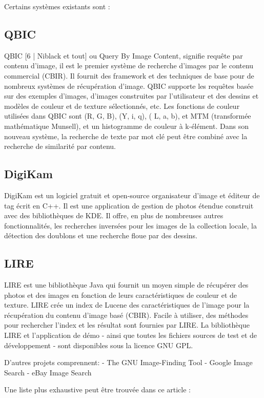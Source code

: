 Certains systèmes existants sont : 

\subsection*{QBIC}
	QBIC [6 | Niblack et tout] ou Query By Image Content, signifie requête par contenu d'image, il est le premier système de recherche d'images par le contenu commercial (CBIR). Il fournit des framework et des techniques de base pour de nombreux systèmes de récupération d'image. QBIC supporte les requêtes basée sur des exemples d'images, d'images construites par l'utilisateur et des dessins et modèles de couleur et de texture sélectionnés, etc. Les fonctions de couleur utilisées dans QBIC sont (R, G, B), (Y, i, q), ( L, a, b), et MTM (transformée mathématique Munsell), et un histogramme de couleur à k-élément. Dans son nouveau système, la recherche de texte par mot clé peut être combiné avec la recherche de similarité par contenu.



\subsection*{DigiKam}
	DigiKam est un logiciel gratuit et open-source organisateur d'image et éditeur de tag écrit en  C++. Il est une application de gestion de photos étendue construit avec des bibliothèques de KDE. Il offre, en plus de nombreuses autres fonctionnalités, les recherches inversées pour les images de la collection locale, la détection des doublons et une recherche floue par des dessins.

\subsection*{LIRE}
	LIRE est une bibliothèque Java qui fournit un moyen simple de récupérer des photos et des images en fonction de leurs caractéristiques de couleur et de texture. LIRE crée un index de Lucene des caractéristiques de l'image pour la récupération du contenu d'image basé (CBIR). Facile à utiliser, des méthodes pour rechercher l'index et les résultat sont fournies par LIRE. La bibliothèque LIRE et l'application de démo - ainsi que toutes les fichiers sources de test et de développement - sont disponibles sous la licence GNU GPL.

D'autres projets comprennent:
- The GNU Image-Finding Tool
- Google Image Search
- eBay Image Search

Une liste plus exhaustive peut être trouvée dans ce article :

